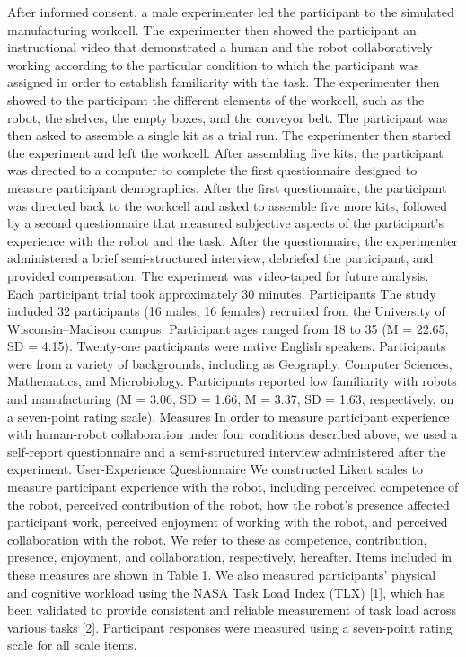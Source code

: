       After informed consent, a male experimenter led the participant to the simulated manufacturing workcell. The experimenter then showed the participant an instructional video that demonstrated a human and the robot collaboratively working according to the particular condition to which the participant was assigned in order to establish familiarity with the task. The experimenter then showed to the participant the different elements of the workcell, such as the robot, the shelves, the empty boxes, and the conveyor belt. The participant was then asked to assemble a single kit as a trial run. The experimenter then started the experiment and left the workcell. After assembling five kits, the participant was directed to a computer to complete the first questionnaire designed to measure participant demographics. After the first questionnaire,  the participant was directed back to the workcell and asked to assemble five more kits, followed by a second questionnaire that measured subjective aspects of the participant’s experience with the robot and the task. After the questionnaire, the experimenter administered a brief semi-structured interview, debriefed the participant, and provided compensation. The experiment was video-taped for future analysis. Each participant trial took approximately 30 minutes.
Participants
       The study included 32 participants (16 males, 16 females) recruited from the University of Wisconsin–Madison campus. Participant ages ranged from 18 to 35 (M = 22.65, SD = 4.15).
Twenty-one participants were native English speakers. Participants were from a variety of backgrounds, including as Geography, Computer Sciences, Mathematics, and Microbiology. Participants reported low familiarity with robots and manufacturing (M = 3.06, SD = 1.66, M = 3.37, SD = 1.63, respectively, on a seven-point rating scale).
Measures
       In order to measure participant experience with human-robot collaboration under four conditions described above, we used a self-report questionnaire and a semi-structured interview administered after the experiment.
User-Experience Questionnaire
       We constructed Likert scales to measure participant experience with the robot, including perceived competence of the robot, perceived contribution of the robot, how the robot’s presence affected participant work, perceived enjoyment of working with the robot, and perceived collaboration with the robot. We refer to these as competence, contribution, presence, enjoyment, and collaboration, respectively, hereafter. Items included in these measures are shown in Table 1. We also measured participants’ physical and cognitive workload using the NASA Task Load Index (TLX) [1], which has been validated to provide consistent and reliable measurement of task load across various tasks [2]. Participant responses were measured using a seven-point rating scale for all scale items. 